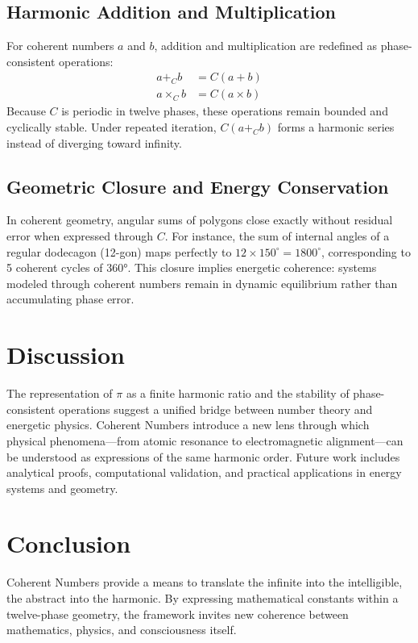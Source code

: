 \documentclass[12pt]{article}
\begin{document}
\subsection{Harmonic Addition and Multiplication}
For coherent numbers $a$ and $b$, addition and multiplication are redefined as phase-consistent operations:
\begin{align}
 a +_C b &= C(a + b) \\
 a \times_C b &= C(a \times b)
\end{align}
Because $C$ is periodic in twelve phases, these operations remain bounded and cyclically stable. Under repeated iteration, $C(a +_C b)$ forms a harmonic series instead of diverging toward infinity.

\subsection{Geometric Closure and Energy Conservation}
In coherent geometry, angular sums of polygons close exactly without residual error when expressed through $C$. For instance, the sum of internal angles of a regular dodecagon (12-gon) maps perfectly to $12 \times 150^\circ = 1800^\circ$, corresponding to 5 coherent cycles of 360°. This closure implies energetic coherence: systems modeled through coherent numbers remain in dynamic equilibrium rather than accumulating phase error.

\section{Discussion}
The representation of $\pi$ as a finite harmonic ratio and the stability of phase-consistent operations suggest a unified bridge between number theory and energetic physics. Coherent Numbers introduce a new lens through which physical phenomena---from atomic resonance to electromagnetic alignment---can be understood as expressions of the same harmonic order. Future work includes analytical proofs, computational validation, and practical applications in energy systems and geometry.

\section{Conclusion}
Coherent Numbers provide a means to translate the infinite into the intelligible, the abstract into the harmonic. By expressing mathematical constants within a twelve-phase geometry, the framework invites new coherence between mathematics, physics, and consciousness itself.



\end{document}
